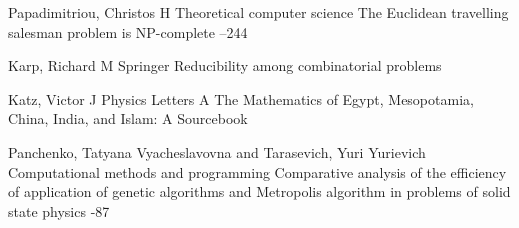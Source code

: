 \documentclass[10pt]{article}
\begin{document}
\begin{thebibliography}{4}
		\by Papadimitriou, Christos H
		\jour Theoretical computer science
		\paper The Euclidean travelling salesman problem is NP-complete
		--244
		
		\by Karp, Richard M
		\jour Springer
		\paper Reducibility among combinatorial problems
		
		\by Katz, Victor J
		\jour Physics Letters A
		\paper The Mathematics of Egypt, Mesopotamia, China, India, and Islam: A Sourcebook
		
		\by Panchenko, Tatyana Vyacheslavovna and Tarasevich, Yuri Yurievich
		\jour Computational methods and programming
		\paper Comparative analysis of the efficiency of application of genetic algorithms and Metropolis algorithm in problems of solid state physics
		-87
		
	\end{thebibliography}
	
	\EndArticle
	
\end{document}
